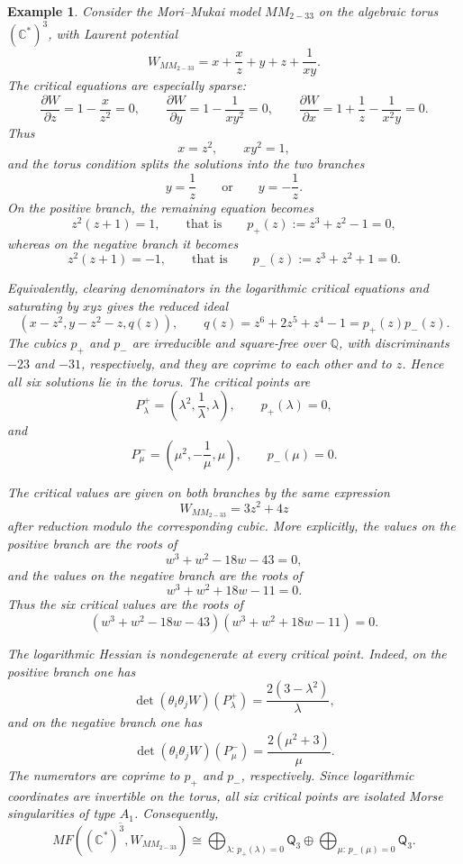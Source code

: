 \documentclass[11pt]{amsart}
\newtheorem{example}{Example}[section]
\newcommand{\MorseCat}[1]{\mathsf{Q}_{#1}}
\begin{document}
\begin{example}
Consider the Mori--Mukai model $MM_{2-33}$ on the algebraic torus
$(\mathbb{C}^*)^3$, with Laurent potential
\[
W_{MM_{2-33}}=x+\frac{x}{z}+y+z+\frac{1}{xy}.
\]
The critical equations are especially sparse:
\[
\frac{\partial W}{\partial z}=1-\frac{x}{z^2}=0,
\qquad
\frac{\partial W}{\partial y}=1-\frac{1}{xy^2}=0,
\qquad
\frac{\partial W}{\partial x}=1+\frac{1}{z}-\frac{1}{x^2y}=0.
\]
Thus
\[
x=z^2,
\qquad
xy^2=1,
\]
and the torus condition splits the solutions into the two branches
\[
y=\frac{1}{z}
\qquad\text{or}\qquad
y=-\frac{1}{z}.
\]
On the positive branch, the remaining equation becomes
\[
z^2(z+1)=1,
\qquad\text{that is}\qquad
p_+(z):=z^3+z^2-1=0,
\]
whereas on the negative branch it becomes
\[
z^2(z+1)=-1,
\qquad\text{that is}\qquad
p_-(z):=z^3+z^2+1=0.
\]

Equivalently, clearing denominators in the logarithmic critical equations and
saturating by $xyz$ gives the reduced ideal
\[
\left(
x-z^2,
y-z^2-z,
q(z)
\right),
\qquad
q(z)=z^6+2z^5+z^4-1=p_+(z)p_-(z).
\]
The cubics $p_+$ and $p_-$ are irreducible and square-free over $\mathbb{Q}$,
with discriminants $-23$ and $-31$, respectively, and they are coprime to each
other and to $z$. Hence all six solutions lie in the torus. The critical
points are
\[
P^+_{\lambda}=\left(\lambda^2,\frac{1}{\lambda},\lambda\right),
\qquad p_+(\lambda)=0,
\]
and
\[
P^-_{\mu}=\left(\mu^2,-\frac{1}{\mu},\mu\right),
\qquad p_-(\mu)=0.
\]

The critical values are given on both branches by the same expression
\[
W_{MM_{2-33}}=3z^2+4z
\]
after reduction modulo the corresponding cubic. More explicitly, the values
on the positive branch are the roots of
\[
w^3+w^2-18w-43=0,
\]
and the values on the negative branch are the roots of
\[
w^3+w^2+18w-11=0.
\]
Thus the six critical values are the roots of
\[
(w^3+w^2-18w-43)(w^3+w^2+18w-11)=0.
\]

The logarithmic Hessian is nondegenerate at every critical point. Indeed, on
the positive branch one has
\[
\det(\theta_i\theta_jW)(P^+_{\lambda})
=\frac{2(3-\lambda^2)}{\lambda},
\]
and on the negative branch one has
\[
\det(\theta_i\theta_jW)(P^-_{\mu})
=\frac{2(\mu^2+3)}{\mu}.
\]
The numerators are coprime to $p_+$ and $p_-$, respectively. Since logarithmic
coordinates are invertible on the torus, all six critical points are isolated
Morse singularities of type $A_1$. Consequently,
\[
\overline{MF((\mathbb{C}^*)^3,W_{MM_{2-33}})}
\cong \bigoplus_{\lambda:\,p_+(\lambda)=0}\MorseCat{3} \oplus \bigoplus_{\mu:\,p_-(\mu)=0}\MorseCat{3}.
\]
\end{example}
\end{document}
